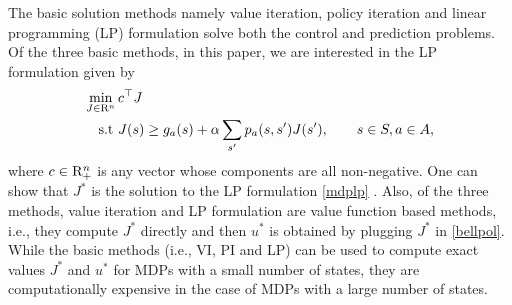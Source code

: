 The basic solution methods namely value iteration, policy iteration and linear programming (LP) formulation \cite{BertB} solve both the control and prediction problems. Of the three basic methods, in this paper, we are interested in the LP formulation given by
\begin{align}\label{mdplp}
\begin{split}
\min_{J\in \mathrm{R}^n}\, &c^\top J\\
\text{s.t}\mbox{ } &J(s)\geq g_a(s)+\alpha\sum_{s'}p_a(s,s')J(s'), \qquad s\in S, a \in A,
\end{split}
\end{align}
where $c\in \mathrm{R}^n_+$ is any vector whose components are all non-negative. One can show that $J^*$ is the solution to the LP formulation \eqref{mdplp} \cite{BertB}. 
Also, of the three methods, value iteration and LP formulation are value function based methods, i.e., they compute $J^*$ directly and then $u^*$ is obtained by plugging $J^*$ in \eqref{bellpol}.\\
While the basic methods (i.e., VI, PI and LP) can be used to compute exact values $J^*$ and $u^*$ for MDPs with a small number of states, they are computationally expensive in the case of MDPs with a large number of states.\\
